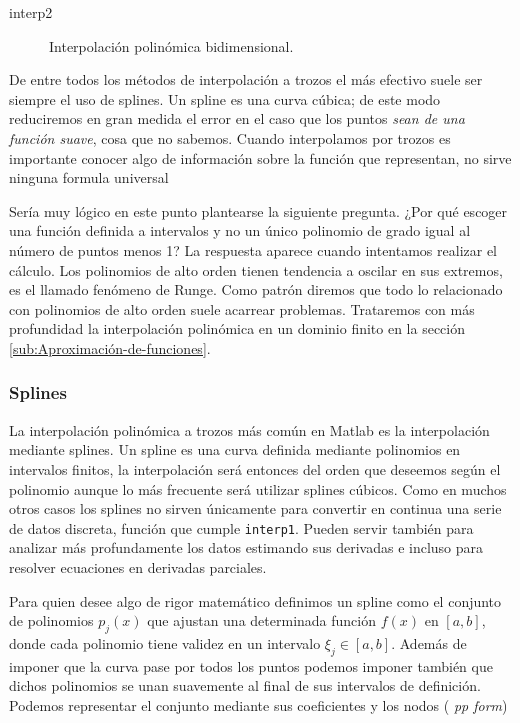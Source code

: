 \begin{description}
\item [interp2\texttt{}]Interpolación polinómica
  bidimensional.
\end{description}
De entre todos los métodos de interpolación a trozos el más efectivo
suele ser siempre el uso de splines. Un spline es una curva cúbica; de
este modo reduciremos en gran medida el error en el caso que los
puntos \emph{sean de una función suave}, cosa que no sabemos. Cuando
interpolamos por trozos es importante conocer algo de información
sobre la función que representan, no sirve ninguna formula universal

Sería muy lógico en este punto plantearse la siguiente pregunta. ¿Por
qué escoger una función definida a intervalos y no un único polinomio
de grado igual al número de puntos menos 1? La respuesta aparece
cuando intentamos realizar el cálculo. Los polinomios de alto orden
tienen tendencia a oscilar en sus extremos, es el llamado fenómeno de
Runge.  Como patrón diremos que todo lo relacionado con polinomios de
alto orden suele acarrear problemas. Trataremos con más profundidad la
interpolación polinómica en un dominio finito en la sección
\ref{sub:Aproximación-de-funciones}.

\subsubsection{Splines}
\label{sec:splines}
La interpolación polinómica a trozos más común en Matlab es la
interpolación mediante splines.  Un spline es una curva definida
mediante polinomios en intervalos finitos, la interpolación será
entonces del orden que deseemos según el polinomio aunque lo más
frecuente será utilizar splines cúbicos.  Como en muchos otros casos
los splines no sirven únicamente para convertir en continua una serie
de datos discreta, función que cumple \texttt{interp1}.  Pueden servir
también para analizar más profundamente los datos estimando sus
derivadas e incluso para resolver ecuaciones en derivadas parciales.

Para quien desee algo de rigor matemático definimos un spline como el
conjunto de polinomios $p_j(x)$ que ajustan una determinada función
$f(x)$ en $[a,b]$, donde cada polinomio tiene validez en un intervalo
$\xi_j \in [a,b]$.  Además de imponer que la curva pase por todos los
puntos podemos imponer también que dichos polinomios se unan
suavemente al final de sus intervalos de definición.  Podemos
representar el conjunto mediante sus coeficientes y los nodos (
\emph{pp form})

